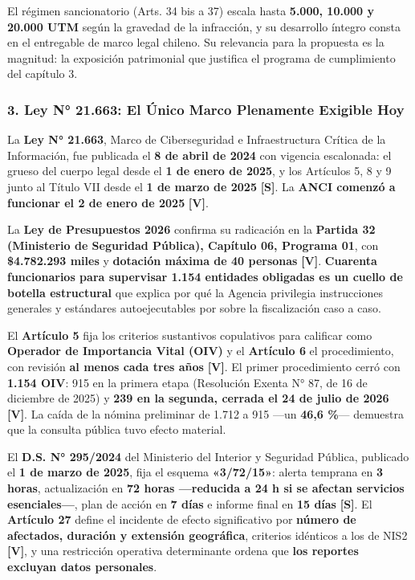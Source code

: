 El régimen sancionatorio (Arts. 34 bis a 37) escala hasta \textbf{5.000, 10.000 y 20.000 UTM} según la gravedad de la infracción, y su desarrollo íntegro consta en el entregable de marco legal chileno. Su relevancia para la propuesta es la magnitud: la exposición patrimonial que justifica el programa de cumplimiento del capítulo 3.

\subsubsection{3. Ley N° 21.663: El Único Marco Plenamente Exigible Hoy}\label{ley-n-21.663-el-uxfanico-marco-plenamente-exigible-hoy}

La \textbf{Ley N° 21.663}, Marco de Ciberseguridad e Infraestructura Crítica de la Información, fue publicada el \textbf{8 de abril de 2024} con vigencia escalonada: el grueso del cuerpo legal desde el \textbf{1 de enero de 2025}, y los Artículos 5, 8 y 9 junto al Título VII desde el \textbf{1 de marzo de 2025} \textbf{{[}S{]}}. La \textbf{ANCI comenzó a funcionar el 2 de enero de 2025} \textbf{{[}V{]}}.

La \textbf{Ley de Presupuestos 2026} confirma su radicación en la \textbf{Partida 32 (Ministerio de Seguridad Pública), Capítulo 06, Programa 01}, con \textbf{\$4.782.293 miles} y \textbf{dotación máxima de 40 personas} \textbf{{[}V{]}}. \textbf{Cuarenta funcionarios para supervisar 1.154 entidades obligadas es un cuello de botella estructural} que explica por qué la Agencia privilegia instrucciones generales y estándares autoejecutables por sobre la fiscalización caso a caso.

El \textbf{Artículo 5} fija los criterios sustantivos copulativos para calificar como \textbf{Operador de Importancia Vital (OIV)} y el \textbf{Artículo 6} el procedimiento, con revisión \textbf{al menos cada tres años} \textbf{{[}V{]}}. El primer procedimiento cerró con \textbf{1.154 OIV}: 915 en la primera etapa (Resolución Exenta N° 87, de 16 de diciembre de 2025) y \textbf{239 en la segunda, cerrada el 24 de julio de 2026} \textbf{{[}V{]}}. La caída de la nómina preliminar de 1.712 a 915 ---un \textbf{46,6 \%}--- demuestra que la consulta pública tuvo efecto material.

El \textbf{D.S. N° 295/2024} del Ministerio del Interior y Seguridad Pública, publicado el \textbf{1 de marzo de 2025}, fija el esquema \textbf{«3/72/15»}: alerta temprana en \textbf{3 horas}, actualización en \textbf{72 horas ---reducida a 24 h si se afectan servicios esenciales---}, plan de acción en \textbf{7 días} e informe final en \textbf{15 días} \textbf{{[}S{]}}. El \textbf{Artículo 27} define el incidente de efecto significativo por \textbf{número de afectados, duración y extensión geográfica}, criterios idénticos a los de NIS2 \textbf{{[}V{]}}, y una restricción operativa determinante ordena que \textbf{los reportes excluyan datos personales}.

